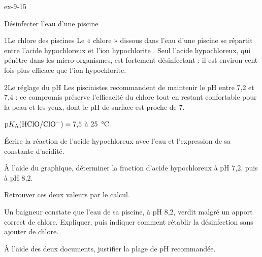 \begin{blocLivre}{ex-9-15}
\begin{exercice}[3]{Désinfecter l'eau d'une piscine}
\begin{docu}{1}{Le chlore des piscines}
Le « chlore » dissous dans l'eau d'une piscine se répartit entre l'acide hypochloreux  et l'ion hypochlorite
. Seul l'acide hypochloreux, qui pénètre dans les micro-organismes, est fortement désinfectant : il est
environ cent fois plus efficace que l'ion hypochlorite.
\end{docu}
\begin{docu}{2}{Le réglage du pH}
Les piscinistes recommandent de maintenir le pH entre 7,2 et 7,4 : ce compromis préserve l'efficacité du chlore tout
en restant confortable pour la peau et les yeux, dont le pH de surface est proche de 7.
\end{docu}
\begin{donnees}
$\pKa(\ce{HClO}/\ce{ClO-})=7{,}5$ à 25~°C.
\end{donnees}
\begin{questions}
\item Écrire la réaction de l'acide hypochloreux avec l'eau et l'expression de sa constante d'acidité.
\item À l'aide du graphique, déterminer la fraction d'acide hypochloreux à pH 7,2, puis à pH 8,2.
\item Retrouver ces deux valeurs par le calcul.
\item Un baigneur constate que l'eau de sa piscine, à pH 8,2, verdit malgré un apport correct de chlore. Expliquer, puis
indiquer comment rétablir la désinfection sans ajouter de chlore.
\item \initiative À l'aide des deux documents, justifier la plage de pH recommandée.
\end{questions}
\end{exercice}
\end{blocLivre}
